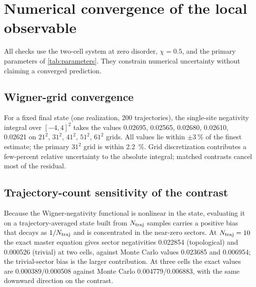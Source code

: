 \documentclass[aps,pra,preprint,superscriptaddress,amsmath,amssymb]{revtex4-2}
\begin{document}
\section{Numerical convergence of the local observable}
\label{sec:convergence}

All checks use the two-cell system at zero disorder, $\chi=\num{0.5}$, and the primary parameters of \cref{tab:parameters}. They constrain numerical uncertainty without claiming a converged prediction.

\subsection{Wigner-grid convergence}

For a fixed final state (one realization, \num{200} trajectories), the single-site negativity integral over $[-4,4]^2$ takes the values \num{0.02695}, \num{0.02565}, \num{0.02680}, \num{0.02610}, \num{0.02621} on $\num{21}^2$, $\num{31}^2$, $\num{41}^2$, $\num{51}^2$, $\num{61}^2$ grids. All values lie within $\pm\qty{3}{\percent}$ of the finest estimate; the primary $\num{31}^2$ grid is within \qty{2.2}{\percent}. Grid discretization contributes a few-percent relative uncertainty to the absolute integral; matched contrasts cancel most of the residual.

\subsection{Trajectory-count sensitivity of the contrast}
\label{sec:trajcount}

Because the Wigner-negativity functional is nonlinear in the state, evaluating it on a trajectory-averaged state built from $N_{\rm traj}$ samples carries a positive bias that decays as $1/N_{\rm traj}$ and is concentrated in the near-zero sectors. At $N_{\rm traj}=\num{10}$ the exact master equation gives sector negativities \num{0.022854} (topological) and \num{0.000526} (trivial) at two cells, against Monte Carlo values \num{0.023685} and \num{0.006954}; the trivial-sector bias is the larger contribution. At three cells the exact values are \num{0.000389}/\num{0.000508} against Monte Carlo \num{0.004779}/\num{0.006883}, with the same downward direction on the contrast.
\end{document}
